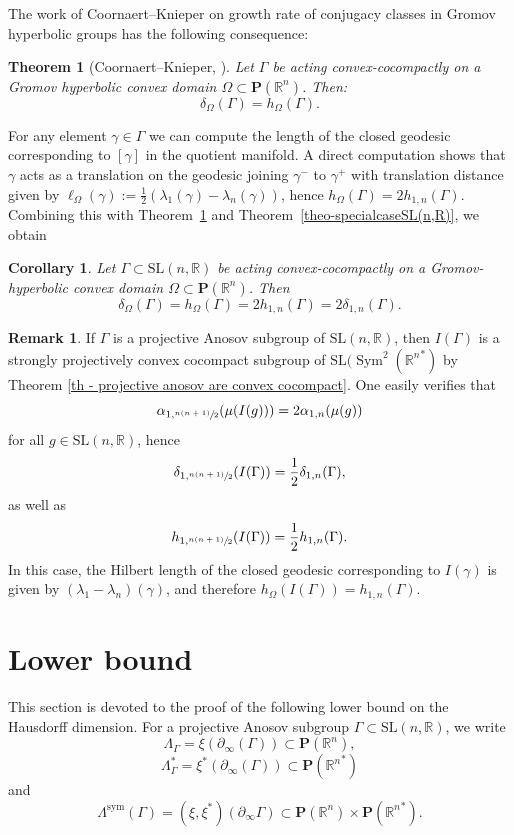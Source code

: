 \documentclass[11pt]{article}
\numberwithin{equation}{section}
\newtheorem{theorem}[theo]{Theorem}
\newtheorem{coro}[theo]{Corollary}
\theoremstyle{definition}
\newtheorem{rmk}[theo]{Remark}
\newcommand{\proj}{\mathbf{P}}
\newcommand{\R}{\mathbb{R}}
\newcommand{\SL}{\mathrm{SL}}
\DeclareMathOperator{\Sym}{Sym}
\let\G\Gamma
\let\g\gamma
\begin{document}
The work of Coornaert--Knieper on growth rate of conjugacy classes in Gromov hyperbolic groups has the following consequence:
\begin{theorem}[Coornaert--Knieper, \cite{CK}]\label{th - delta = h for convex cocompact gromov hyperbolic}
Let $\G$ be acting convex-cocompactly on a Gromov hyperbolic convex domain $\Omega\subset \proj(\R^n)$. Then:
\[\delta_\Omega(\G)=h_\Omega(\G).\]
\end{theorem}

For any element $\g\in \G$ we can compute the length of the closed geodesic corresponding to $[\g]$ in the quotient manifold. A direct computation shows that $\g$ acts as a translation on the geodesic joining $\g^-$ to $\g^+$ with translation distance given by $\ell_{\Omega}(\g) := \frac{1}{2}(\lambda_1(\g)-\lambda_n(\g))$, hence $h_\Omega(\G)=2h_{1,n}(\G)$. Combining this with Theorem~\ref{th - delta = h for convex cocompact gromov hyperbolic} and Theorem~\ref{theo-specialcaseSL(n,R)}, we obtain
\begin{coro} \label{cor:deltaH=2delta1n}
Let $\G \subset \SL(n,\R)$ be acting convex-cocompactly on a Gromov-hyperbolic convex domain $\Omega\subset \proj(\R^n)$. Then
\[\delta_\Omega(\G)= h_\Omega(\G) = 2 h_{1,n}(\G) = 2 \delta_{1,n}(\G).\]
\end{coro}

\begin{rmk}
If $\Gamma$ is a projective Anosov subgroup of $\SL(n, \R)$, then $I(\Gamma)$ is a strongly projectively convex cocompact subgroup of $\SL(\Sym^2({\R^n}^*)$ by Theorem \ref{th - projective anosov are convex cocompact}. One easily verifies that
\[\alpha_{1, \sfrac{n(n+1)}{2}}(\mu(I(g))) = 2 \alpha_{1,n}(\mu(g))\]
for all $g\in \SL(n,\R)$, hence
\[\delta_{1, \sfrac{n(n+1)}{2}}(I(\Gamma)) = \frac{1}{2} \delta_{1,n}(\Gamma),\]
as well as
\[h_{1, \sfrac{n(n+1)}{2}}(I(\Gamma)) = \frac{1}{2} h_{1,n}(\Gamma).\]
In this case, the Hilbert length of the closed geodesic corresponding to $I(\g)$ is given by $(\lambda_1-\lambda_n)(\g)$, and therefore $h_\Omega(I(\G)) = h_{1,n}(\G)$.
\end{rmk}

\section{Lower bound} \label{sec - lower bound}
This section is devoted to the proof of the following lower bound on the Hausdorff dimension. For a projective Anosov subgroup $\G \subset \SL(n,\R)$, we write
\[\Lambda_\G = \xi(\partial_\infty(\G)) \subset \proj(\R^n),\]
\[\Lambda^*_\G = \xi^*(\partial_\infty(\G)) \subset \proj({\R^n}^*)\]
and
\[\Lambda^{\mathrm{sym}}(\G) = (\xi,\xi^*)(\partial_\infty \G) \subset \proj(\R^n)\times \proj({\R^n}^*).\]
\end{document}
